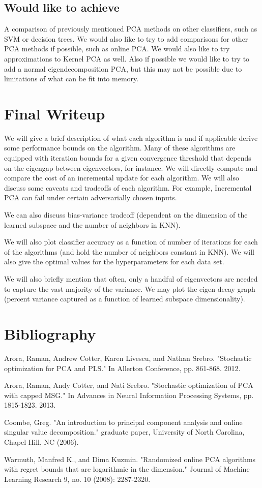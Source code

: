 \documentclass[11pt]{article}
\begin{document}
\subsection{Would like to achieve}
A comparison of previously mentioned PCA methods on other classifiers, such as SVM or decision trees. We would also like to try to add comparisons for other PCA methods if possible, such as online PCA. We would also like to try approximations to Kernel PCA as well. Also if possible we would like to try to add a normal eigendecomposition PCA, but this may not be possible due to limitations of what can be fit into memory.

\section{Final Writeup}
We will give a brief description of what each algorithm is and if applicable derive some performance bounds on the algorithm. Many of these algorithms are equipped with iteration bounds for a given convergence threshold that depends on the eigengap between eigenvectors, for instance. We will directly compute and compare the cost of an incremental update for each algorithm. We will also discuss some caveats and tradeoffs of each algorithm. For example, Incremental PCA can fail under certain adversarially chosen inputs. 

We can also discuss bias-variance tradeoff (dependent on the dimension of the learned subspace and the number of neighbors in KNN). 

We will also plot classifier accuracy as a function of number of iterations for each of the algorithms (and hold the number of neighbors constant in KNN). We will also give the optimal values for the hyperparameters for each data set. 

We will also briefly mention that often, only a handful of eigenvectors are needed to capture the vast majority of the variance. We may plot the eigen-decay graph (percent variance captured as a function of learned subspace dimensionality). 



\section{Bibliography}
Arora, Raman, Andrew Cotter, Karen Livescu, and Nathan Srebro. "Stochastic optimization for PCA and PLS." In Allerton Conference, pp. 861-868. 2012.

Arora, Raman, Andy Cotter, and Nati Srebro. "Stochastic optimization of PCA with capped MSG." In Advances in Neural Information Processing Systems, pp. 1815-1823. 2013.

Coombe, Greg. "An introduction to principal component analysis and online singular value decomposition." graduate paper, University of North Carolina, Chapel Hill, NC (2006).

Warmuth, Manfred K., and Dima Kuzmin. "Randomized online PCA algorithms with regret bounds that are logarithmic in the dimension." Journal of Machine Learning Research 9, no. 10 (2008): 2287-2320.
\end{document}
